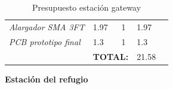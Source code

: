\documentclass[12pt]{article}
\begin{document}
\begin{table}[h!]
\begin{tabular}{l|l|l|l|l}
			\multicolumn{1}{|l|}{\textit{Alargador SMA 3FT}}                 & 1.97                                                 & 1                                      & 1.97                                            &  \\ \cline{1-4}
			\multicolumn{1}{|l|}{\textit{PCB prototipo final}}               & 1.3                                                  & 1                                      & 1.3                                             &  \\ \cline{1-4}
			\multicolumn{1}{r|}{}                                            & \multicolumn{2}{r|}{\textbf{TOTAL:}}                                                          & 21.58                                           &  \\ \cline{2-4}
		\end{tabular}
		\caption{Presupuesto estación gateway}
		\label{tab:estacion-gateway}
	\end{table}
	
	\pagebreak
	
	\noindent \textbf{Estación del refugio}\\
	
\end{document}
